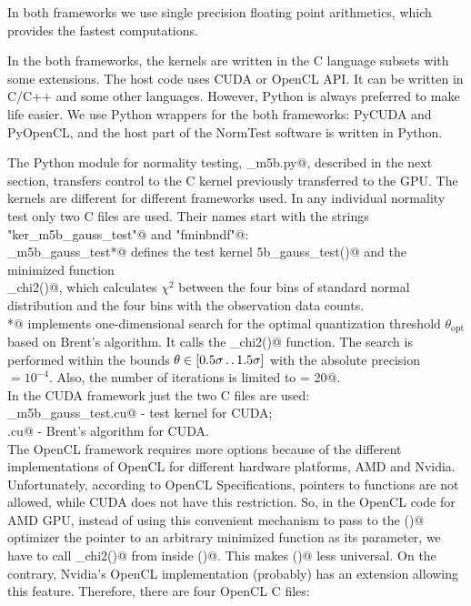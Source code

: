 \documentclass[letterpaper,twoside,12pt]{article}
\newcommand{\twodots}{\mathinner {\ldotp \ldotp}}
\begin{document}
In both frameworks we use single precision floating point arithmetics, which provides the fastest computations.

In the both frameworks, the kernels are written in the C language subsets with some extensions. The host code uses CUDA or OpenCL API. It can be written in C/C++ and some other languages. However, Python is always preferred to make life easier. We use Python wrappers for the both frameworks: PyCUDA and PyOpenCL, and the host part of the NormTest software is written in Python. 

The Python module for normality testing, \verb@gpu_m5b.py@, described in the next section, transfers control to the C kernel previously transferred to the GPU. The kernels are different for different frameworks used. In any individual normality test only two C files are used. Their names start with the strings \verb@"ker_m5b_gauss_test"@ and \verb@"fminbndf"@: \\

\noindent \verb@ker_m5b_gauss_test*@ defines the test kernel \verb@m5b_gauss_test()@ and the minimized function  \\
\hangindent=0.7cm \verb@calc_chi2()@, which calculates $\chi^2$ between the four bins of standard normal distribution and the four bins with the observation data counts. \\

\noindent \verb@fminbndf*@ implements one-dimensional search for the optimal quantization threshold $\theta_\text{opt}$  \\
\hangindent=0.7cm based on Brent's algorithm. It calls the \verb@calc_chi2()@ function. The search is performed within the bounds $\theta \in [0.5\sigma \twodots 1.5\sigma]$ with the absolute precision \verb@atol@ $=10^{-4}$. Also, the number of iterations is limited to  \verb@maxiter = 20@. \\


In the CUDA framework just the two C files are used: \\

\noindent \verb@ker_m5b_gauss_test.cu@  - test kernel for CUDA; \\
\noindent \verb@fminbndf.cu@ - Brent's algorithm for CUDA. \\

The OpenCL framework requires more options because of the different implementations of OpenCL for different hardware platforms, AMD and Nvidia. Unfortunately, according to OpenCL Specifications, pointers to functions are not allowed, while CUDA does not have this restriction. So, in the OpenCL code for AMD GPU, instead of using this convenient mechanism to pass to the \verb@fminbndf()@ optimizer the pointer to an arbitrary minimized function as its parameter, we have to call \verb@calc_chi2()@ from inside \verb@fminbndf()@. This makes \verb@fminbndf()@ less universal. On the contrary, Nvidia's OpenCL implementation (probably) has an extension allowing this feature. Therefore, there are four OpenCL C files: \\
\end{document}
